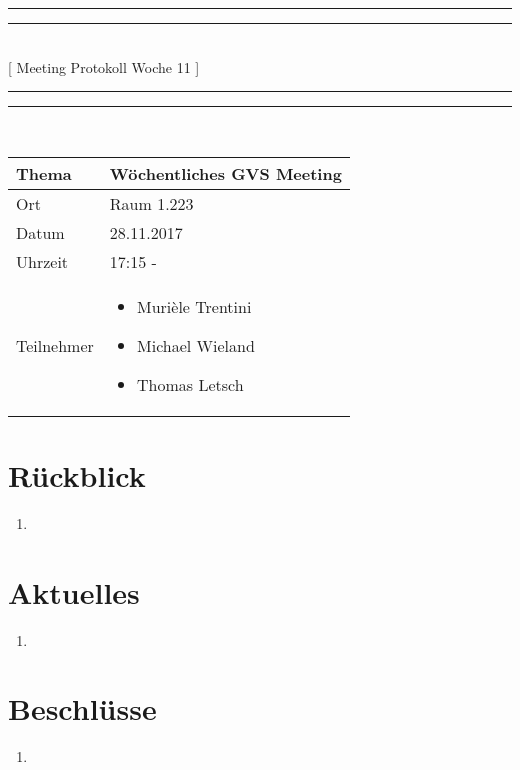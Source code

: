 \documentclass[11pt, a4paper,oneside]{scrartcl}
\begin{document}
	\centering
	\rule{\textwidth}{1.6pt}\vspace*{-\baselineskip}\vspace*{2pt} %
	\rule{\textwidth}{0.4pt}\\[\baselineskip] %
	{\LARGE [ Meeting Protokoll Woche 11 ]}\\[0.2\baselineskip] %
	\rule{\textwidth}{0.4pt}\vspace*{-\baselineskip}\vspace{3.2pt} %
	\rule{\textwidth}{1.6pt}\\[2\baselineskip] %
	
	\begin{tabu} to \linewidth {l X }
		\toprule
		\textbf{Thema} & \textbf{Wöchentliches GVS Meeting} \\
		\midrule
		Ort & Raum 1.223 \\
		Datum & 28.11.2017  \\
		Uhrzeit &  17:15 -  \\
		Teilnehmer & 
		\begin{minipage}[t]{\textwidth}
			\begin{itemize}
				\item Murièle Trentini
				\item Michael Wieland
				\item Thomas Letsch
			\end{itemize}
		\end{minipage}
		\\
		\bottomrule
	\end{tabu}
	
	
	\section{Rückblick}
	\begin{enumerate}
		\item
	\end{enumerate}
	
	\section{Aktuelles}
	\begin{enumerate}
		\item 
	\end{enumerate}
	
	\section{Beschlüsse}
	\begin{enumerate}
		\item 
	\end{enumerate} 
	
\end{document}
